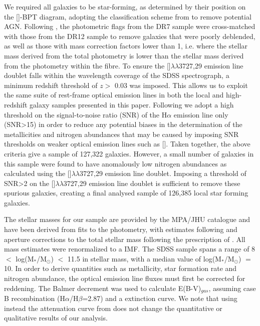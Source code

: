 \documentclass[usenatbib]{mnras} %
\begin{document}
We required all galaxies to be star-forming, as determined by their position on the []-BPT diagram, adopting the classification scheme from \cite{Kauffmann_2003b} to remove potential AGN. Following \cite{Curti_2020FMR}, the photometric flags from the DR7 sample were cross-matched with those from the DR12 sample to remove galaxies that were poorly deblended, as well as those with mass correction factors lower than 1, i.e. where the stellar mass derived from the total photometry is lower than the stellar mass derived from the photometry within the fibre. To ensure the []$\lambda\lambda$3727,29 emission line doublet falls within the wavelength coverage of the SDSS spectrograph, a minimum redshift threshold of $z >$ 0.03 was imposed. This allows us to exploit the same suite of rest-frame optical emission lines in both the local and high-redshift galaxy samples presented in this paper. Following \cite{Mannucci_2010} we adopt a high threshold on the signal-to-noise ratio (SNR) of the H$\alpha$ emission line only (SNR>15) in order to reduce any potential biases in the determination of the metallicities and nitrogen abundances that may be caused by imposing SNR thresholds on weaker optical emission lines such as []. Taken together, the above criteria give a sample of 127,322 galaxies. However, a small number of galaxies in this sample were found to have anomalously low nitrogen abundances as calculated using the []$\lambda\lambda$3727,29 emission line doublet. Imposing a threshold of SNR>2 on the []$\lambda\lambda$3727,29 emission line doublet is sufficient to remove these spurious galaxies, creating a final analysed sample of 126,385 local star forming galaxies. 

The stellar masses for our sample are provided by the MPA/JHU catalogue and have been derived from fits to the photometry, with estimates following \cite{Kauffmann_2003a} and aperture corrections to the total stellar mass following the prescription of \cite{Salim_2007}. All mass estimates were renormalized to a \cite{Chabrier_2003} IMF. The SDSS sample spans a range of  8 $<$ log(M$_*$/M$_{\odot}$) $<$ 11.5 in stellar mass, with a median value of log(M$_*$/M$_{\odot}$) $=$ 10. In order to derive quantities such as metallicity, star formation rate and nitrogen abundance, the optical emission line fluxes must first be corrected for reddening. The Balmer decrement was used to calculate E(B-V)$_{gas}$, assuming case B recombination (H$\alpha$/H$\beta$=2.87) and a \cite{Calzetti_2000} extinction curve. We note that using instead the attenuation curve from \cite{Cardelli_1989} does not change the quantitative or qualitative results of our analysis. 
\end{document}
